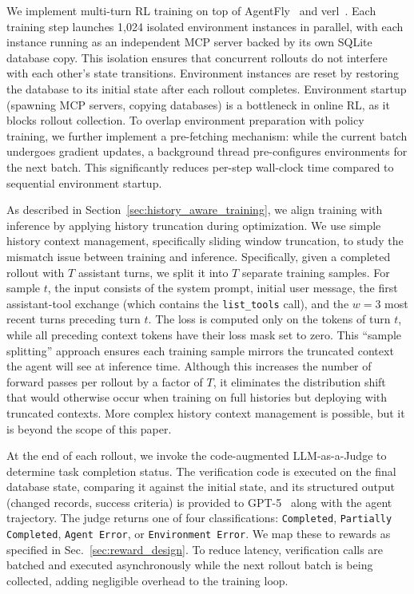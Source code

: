 We implement multi-turn RL training on top of AgentFly~\citep{wang2025agentfly} and verl~\citep{verl}.
Each training step launches 1,024 isolated environment instances in parallel, with each instance running as an independent MCP server backed by its own SQLite database copy.
This isolation ensures that concurrent rollouts do not interfere with each other's state transitions.
Environment instances are reset by restoring the database to its initial state after each rollout completes.
Environment startup (spawning MCP servers, copying databases) is a bottleneck in online RL, as it blocks rollout collection.
To overlap environment preparation with policy training, we further implement a pre-fetching mechanism: while the current batch undergoes gradient updates, a background thread pre-configures environments for the next batch.
This significantly reduces per-step wall-clock time compared to sequential environment startup.

As described in Section~\ref{sec:history_aware_training}, we align training with inference by applying history truncation during optimization.
We use simple history context management, specifically sliding window truncation, to study the mismatch issue between training and inference.
Specifically, given a completed rollout with $T$ assistant turns, we split it into $T$ separate training samples.
For sample $t$, the input consists of the system prompt, initial user message, the first assistant-tool exchange (which contains the \texttt{list\_tools} call), and the $w=3$ most recent turns preceding turn $t$.
The loss is computed only on the tokens of turn $t$, while all preceding context tokens have their loss mask set to zero.
This ``sample splitting'' approach ensures each training sample mirrors the truncated context the agent will see at inference time. Although this increases the number of forward passes per rollout by a factor of $T$, it eliminates the distribution shift that would otherwise occur when training on full histories but deploying with truncated contexts.
More complex history context management is possible, but it is beyond the scope of this paper.

At the end of each rollout, we invoke the code-augmented LLM-as-a-Judge to determine task completion status.
The verification code is executed on the final database state, comparing it against the initial state, and its structured output (changed records, success criteria) is provided to GPT-5~\citep{openai_gpt5_2025} along with the agent trajectory.
The judge returns one of four classifications: \texttt{Completed}, \texttt{Partially Completed}, \texttt{Agent Error}, or \texttt{Environment Error}.
We map these to rewards as specified in Sec.~\ref{sec:reward_design}.
To reduce latency, verification calls are batched and executed asynchronously while the next rollout batch is being collected, adding negligible overhead to the training loop.

